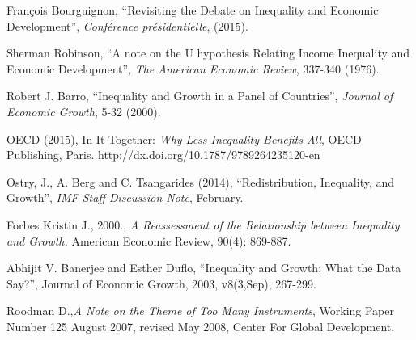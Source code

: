 \documentclass[11pt,a4paper]{article}
\begin{document}
\begin{thebibliography}{20}

François Bourguignon, ``Revisiting the Debate on Inequality and Economic Development'', {\it Conférence présidentielle}, (2015).

Sherman Robinson, ``A note on the U hypothesis Relating Income Inequality and Economic Development'', {\it The American Economic Review}, 337-340 (1976).

Robert J. Barro, ``Inequality and Growth in a Panel of Countries'', {\it Journal of Economic Growth}, 5-32 (2000).

OECD (2015), In It Together: \textit{Why Less Inequality Benefits All}, OECD Publishing, Paris.
http://dx.doi.org/10.1787/9789264235120-en

Ostry, J., A. Berg and C. Tsangarides (2014), “Redistribution, Inequality, and Growth”,
\textit{IMF Staff Discussion Note}, February.

	Forbes Kristin J., 2000., \emph{A Reassessment of the Relationship between Inequality and Growth.} American Economic Review, 90(4): 869-887.

Abhijit V. Banerjee and Esther Duflo, ``Inequality and Growth: What the Data Say?'', Journal of Economic Growth, 2003, v8(3,Sep), 267-299.

Roodman D.,\textit{A Note on the Theme of Too Many Instruments}, Working Paper Number 125 August 2007, revised May 2008, Center For Global Development. 

\end{thebibliography}
\end{document}

